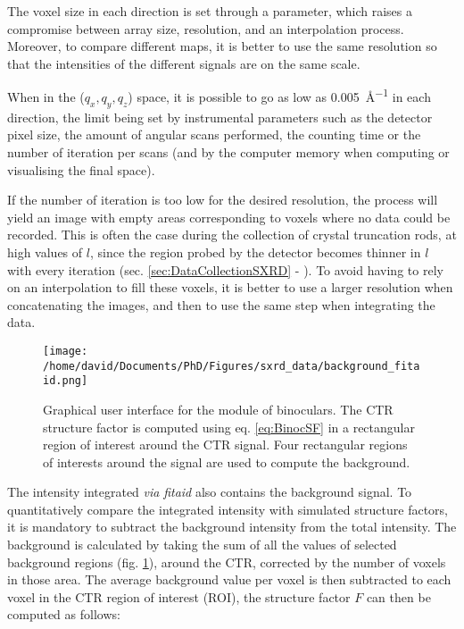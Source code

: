 The voxel size in each direction is set through a parameter, which raises a compromise between array size, resolution, and an interpolation process.
Moreover, to compare different maps, it is better to use the same resolution so that the intensities of the different signals are on the same scale.

When in the ($q_x, q_y, q_z$) space, it is possible to go as low as \qty{0.005}{\angstrom^{-1}} in each direction, the limit being set by instrumental parameters such as the detector pixel size, the amount of angular scans performed, the counting time or the number of iteration per scans (and by the computer memory when computing or visualising the final space).

If the number of iteration is too low for the desired resolution, the process will yield an image with empty areas corresponding to voxels where no data could be recorded.
This is often the case during the collection of crystal truncation rods, at high values of $l$, since the region probed by the detector becomes thinner in $l$ with every iteration (sec. \ref{sec:DataCollectionSXRD} - \cite{Drnec2014}).
To avoid having to rely on an interpolation to fill these voxels, it is better to use a larger resolution when concatenating the images, and then to use the same step when integrating the data.

\begin{figure}[!htb]
    \texttt{[image: /home/david/Documents/PhD/Figures/sxrd\_data/background\_fitaid.png]}
    \caption{
        Graphical user interface for the  module of binoculars.
        The CTR structure factor is computed using eq. \ref{eq:BinocSF} in a rectangular region of interest around the CTR signal.
        Four rectangular regions of interests around the signal are used to compute the background.
    }
    \label{fig:BinocularsBackground}
\end{figure}

The intensity integrated \textit{via} \textit{fitaid} also contains the background signal.
To quantitatively compare the integrated intensity with simulated structure factors, it is mandatory to subtract the background intensity from the total intensity.
The background is calculated by taking the sum of all the values of selected background regions (fig. \ref{fig:BinocularsBackground}), around the CTR, corrected by the number of voxels in those area.
The average background value per voxel is then subtracted to each voxel in the CTR region of interest (ROI), the structure factor $F$ can then be computed as follows:

